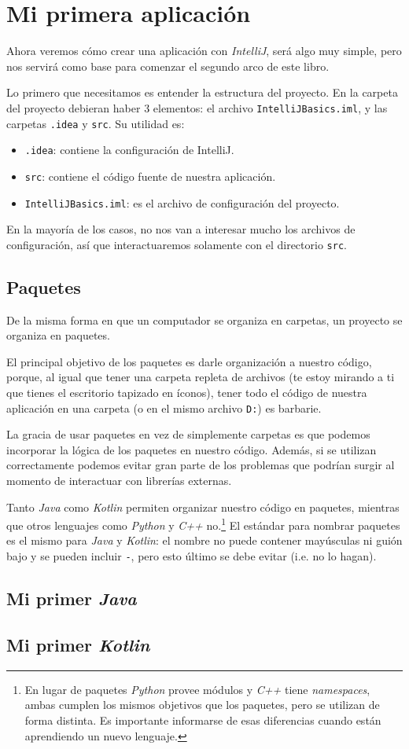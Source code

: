 \section{Mi primera aplicación}
  Ahora veremos cómo crear una aplicación con \textit{IntelliJ}, será algo muy simple, pero nos
  servirá como base para comenzar el segundo arco de este libro.

  Lo primero que necesitamos es entender la estructura del proyecto.
  En la carpeta del proyecto debieran haber 3 elementos: el archivo \texttt{IntelliJBasics.iml}, y 
  las carpetas \texttt{.idea} y \texttt{src}.
  Su utilidad es:
  \begin{itemize}
    \item \texttt{.idea}: contiene la configuración de IntelliJ.
    \item \texttt{src}: contiene el código fuente de nuestra aplicación.
    \item \texttt{IntelliJBasics.iml}: es el archivo de configuración del proyecto.
  \end{itemize}

  En la mayoría de los casos, no nos van a interesar mucho los archivos de configuración, así que
  interactuaremos solamente con el directorio \texttt{src}.

  \subsection{Paquetes}
    De la misma forma en que un computador se organiza en carpetas, un proyecto se organiza en 
    paquetes.

    El principal objetivo de los paquetes es darle organización a nuestro código, porque, al igual 
    que tener una carpeta repleta de archivos (te estoy mirando a ti que tienes el escritorio 
    tapizado en íconos), tener todo el código de nuestra aplicación en una carpeta (o en el mismo 
    archivo \texttt{D:}) es barbarie.

    La gracia de usar paquetes en vez de simplemente carpetas es que podemos incorporar la lógica de
    los paquetes en nuestro código.
    Además, si se utilizan correctamente podemos evitar gran parte de los problemas que podrían
    surgir al momento de interactuar con librerías externas.
    
    Tanto \textit{Java} como \textit{Kotlin} permiten organizar nuestro código en paquetes, mientras
    que otros lenguajes como \textit{Python} y \textit{C++} no.\footnote{En lugar de paquetes 
    \textit{Python} provee módulos y \textit{C++} tiene \textit{namespaces}, ambas cumplen los 
    mismos objetivos que los paquetes, pero se utilizan de forma distinta. 
    Es importante informarse de esas diferencias cuando están aprendiendo un nuevo lenguaje.}
    El estándar para nombrar paquetes es el mismo para \textit{Java} y \textit{Kotlin}: el nombre 
    no puede contener mayúsculas ni guión bajo y se pueden incluir \texttt{-}, pero esto último se
    debe evitar (i.e. no lo hagan).
    
    
  \subsection{Mi primer \textit{Java}}
  \subsection{Mi primer \textit{Kotlin}}

